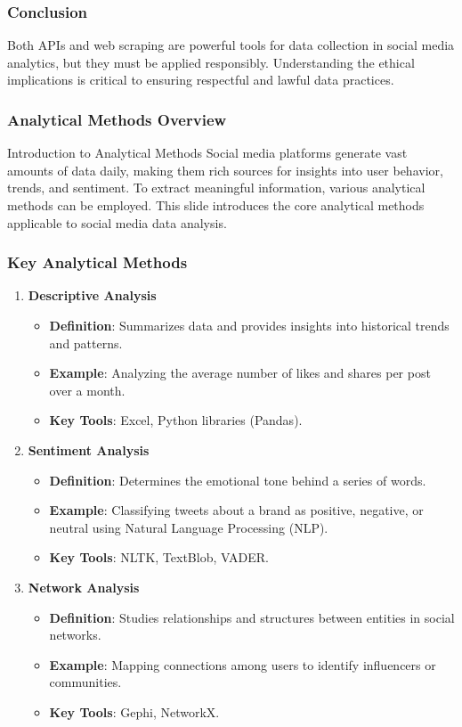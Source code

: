 \documentclass{beamer}
\begin{document}
\begin{frame}
    \frametitle{Conclusion}
    Both APIs and web scraping are powerful tools for data collection in social media analytics, 
    but they must be applied responsibly. Understanding the ethical implications is critical to ensuring 
    respectful and lawful data practices.
\end{frame}

\begin{frame}[fragile]
    \frametitle{Analytical Methods Overview}
    \begin{block}{Introduction to Analytical Methods}
    Social media platforms generate vast amounts of data daily, making them rich sources for insights into user behavior, trends, and sentiment. To extract meaningful information, various analytical methods can be employed. This slide introduces the core analytical methods applicable to social media data analysis.
    \end{block}
\end{frame}

\begin{frame}[fragile]
    \frametitle{Key Analytical Methods}
    \begin{enumerate}
        \item \textbf{Descriptive Analysis}
        \begin{itemize}
            \item \textbf{Definition}: Summarizes data and provides insights into historical trends and patterns.
            \item \textbf{Example}: Analyzing the average number of likes and shares per post over a month.
            \item \textbf{Key Tools}: Excel, Python libraries (Pandas).
        \end{itemize}

        \item \textbf{Sentiment Analysis}
        \begin{itemize}
            \item \textbf{Definition}: Determines the emotional tone behind a series of words.
            \item \textbf{Example}: Classifying tweets about a brand as positive, negative, or neutral using Natural Language Processing (NLP).
            \item \textbf{Key Tools}: NLTK, TextBlob, VADER.
        \end{itemize}

        \item \textbf{Network Analysis}
        \begin{itemize}
            \item \textbf{Definition}: Studies relationships and structures between entities in social networks.
            \item \textbf{Example}: Mapping connections among users to identify influencers or communities.
            \item \textbf{Key Tools}: Gephi, NetworkX.
        \end{itemize}
    \end{enumerate}
\end{frame}
\end{document}

